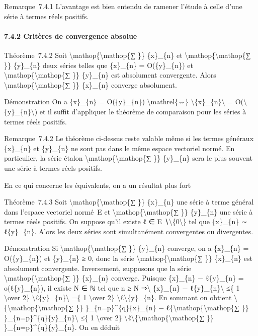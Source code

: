 \documentclass[]{article}
\begin{document}
Remarque~7.4.1 L'avantage est bien entendu de ramener l'étude à celle
d'une série à termes réels positifs.

\paragraph{7.4.2 Critères de convergence absolue}

Théorème~7.4.2 Soit \textbackslash{}mathop\{\textbackslash{}mathop\{∑
\}\} \{x\}\_\{n\} et \textbackslash{}mathop\{\textbackslash{}mathop\{∑
\}\} \{y\}\_\{n\} deux séries telles que \{x\}\_\{n\} = O(\{y\}\_\{n\})
et \textbackslash{}mathop\{\textbackslash{}mathop\{∑ \}\} \{y\}\_\{n\}
est absolument convergente. Alors
\textbackslash{}mathop\{\textbackslash{}mathop\{∑ \}\} \{x\}\_\{n\}
converge absolument.

Démonstration On a \{x\}\_\{n\} = O(\{y\}\_\{n\})
\textbackslash{}mathrel\{⇔\}
\textbackslash{}\textbar{}\{x\}\_\{n\}\textbackslash{}\textbar{} =
O(\textbackslash{}\textbar{}\{y\}\_\{n\}\textbackslash{}\textbar{}) et
il suffit d'appliquer le théorème de comparaison pour les séries à
termes réels positifs.

Remarque~7.4.2 Le théorème ci-dessus reste valable même si les termes
généraux \{x\}\_\{n\} et \{y\}\_\{n\} ne sont pas dans le même espace
vectoriel normé. En particulier, la série étalon
\textbackslash{}mathop\{\textbackslash{}mathop\{∑ \}\} \{y\}\_\{n\} sera
le plus souvent une série à termes réels positifs.

En ce qui concerne les équivalents, on a un résultat plus fort

Théorème~7.4.3 Soit \textbackslash{}mathop\{\textbackslash{}mathop\{∑
\}\} \{x\}\_\{n\} une série à terme général dans l'espace vectoriel
normé~E et \textbackslash{}mathop\{\textbackslash{}mathop\{∑ \}\}
\{y\}\_\{n\} une série à termes réels positifs. On suppose qu'il existe
ℓ ∈ E ∖\textbackslash{}\{0\textbackslash{}\} tel que \{x\}\_\{n\} ∼
ℓ\{y\}\_\{n\}. Alors les deux séries sont simultanément convergentes ou
divergentes.

Démonstration Si \textbackslash{}mathop\{\textbackslash{}mathop\{∑ \}\}
\{y\}\_\{n\} converge, on a \{x\}\_\{n\} = O(\{y\}\_\{n\}) et
\{y\}\_\{n\} ≥ 0, donc la série
\textbackslash{}mathop\{\textbackslash{}mathop\{∑ \}\} \{x\}\_\{n\} est
absolument convergente. Inversement, supposons que la série
\textbackslash{}mathop\{\textbackslash{}mathop\{∑ \}\} \{x\}\_\{n\}
converge. Puisque \{x\}\_\{n\} − ℓ\{y\}\_\{n\} = o(ℓ\{y\}\_\{n\}), il
existe N ∈ ℕ tel que n ≥ N ⇒\textbackslash{}\textbar{} \{x\}\_\{n\} −
ℓ\{y\}\_\{n\}\textbackslash{}\textbar{} ≤\{ 1 \textbackslash{}over 2\}
\textbackslash{}\textbar{}ℓ\{y\}\_\{n\}\textbackslash{}\textbar{} =\{ 1
\textbackslash{}over 2\}
\textbackslash{}\textbar{}ℓ\textbackslash{}\textbar{}\{y\}\_\{n\}. En
sommant on obtient
\textbackslash{}\textbar{}\{\textbackslash{}mathop\{\textbackslash{}mathop\{∑
\}\} \}\_\{n=p\}\^{}\{q\}\{x\}\_\{n\} −
ℓ\{\textbackslash{}mathop\{\textbackslash{}mathop\{∑ \}\}
\}\_\{n=p\}\^{}\{q\}\{y\}\_\{n\}\textbackslash{}\textbar{} ≤\{ 1
\textbackslash{}over 2\}
\textbackslash{}\textbar{}ℓ\textbackslash{}\textbar{}\{\textbackslash{}mathop\{\textbackslash{}mathop\{∑
\}\} \}\_\{n=p\}\^{}\{q\}\{y\}\_\{n\}. On en déduit
\end{document}
